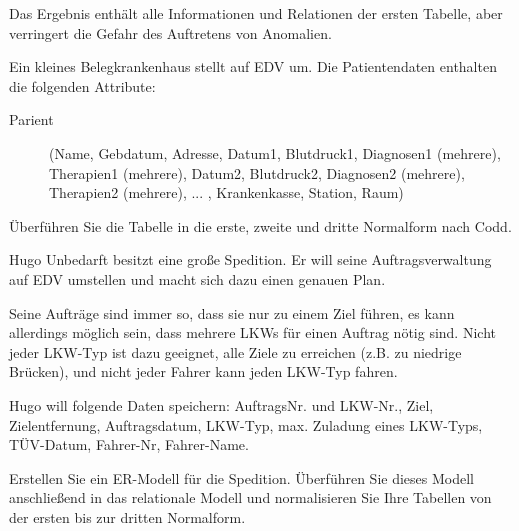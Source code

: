 \documentclass[9pt,a4paper]{arbeitsblatt}
\begin{document}
Das Ergebnis enthält alle Informationen und Relationen der ersten Tabelle, aber
verringert die Gefahr des Auftretens von Anomalien.

\clearpage
\ReiheTitel
\large

\begin{aufgabe}
	Ein kleines Belegkrankenhaus stellt auf EDV um. Die Patientendaten enthalten
	die folgenden Attribute:
	\begin{description}
		\item[Parient] (Name, Gebdatum, Adresse, Datum1, Blutdruck1,
			Diagnosen1 (mehrere), Therapien1 (mehrere), Datum2, Blutdruck2, Diagnosen2
			(mehrere), Therapien2 (mehrere), ... , Krankenkasse, Station, Raum)
	\end{description}

	Überführen Sie die Tabelle in die erste, zweite und dritte Normalform nach
	Codd.
\end{aufgabe}

\begin{aufgabe}
	Hugo Unbedarft besitzt eine große Spedition. Er will seine Auftragsverwaltung
	auf EDV umstellen und macht sich dazu einen genauen Plan.

	Seine Aufträge sind immer so, dass sie nur zu einem Ziel führen, es kann
	allerdings möglich sein, dass mehrere LKWs für einen Auftrag nötig sind. Nicht
	jeder LKW-Typ ist dazu geeignet, alle Ziele zu erreichen (z.B. zu niedrige
	Brücken), und nicht jeder Fahrer kann jeden LKW-Typ fahren.

	Hugo will folgende Daten speichern: AuftragsNr. und LKW-Nr., Ziel,
	Zielentfernung, Auftragsdatum, LKW-Typ, max. Zuladung eines LKW-Typs,
	TÜV-Datum, Fahrer-Nr, Fahrer-Name.

	Erstellen Sie ein ER-Modell für die Spedition. Überführen Sie dieses Modell
	anschließend in das relationale Modell und normalisieren Sie Ihre Tabellen von
	der ersten bis zur dritten Normalform.
\end{aufgabe}
\end{document}
